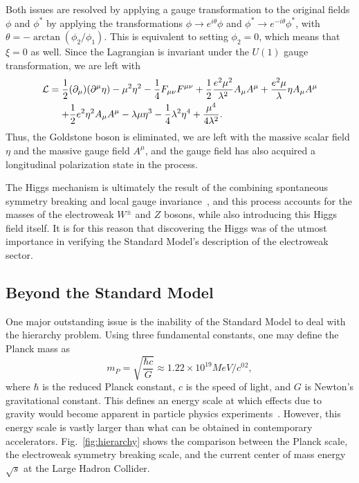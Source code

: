 Both issues are resolved by applying a gauge transformation to the original fields $\phi$ and $\phi^*$ by applying the transformations $\phi\to e^{i\theta}\phi$ and $\phi^*\to e^{-i\theta}\phi^*$, with $\theta=-\arctan(\phi_2/\phi_1)$.
This is equivalent to setting $\phi_2=0$, which means that $\xi=0$ as well.
Since the Lagrangian is invariant under the $U(1)$ gauge transformation, we are left with
\begin{equation}
  \begin{aligned}
    \mathcal{L} &= \frac{1}{2}(\partial_\mu)(\partial^\mu\eta)-\mu^2\eta^2-\frac{1}{4}F_{\mu\nu}F^{\mu\nu}+\frac{1}{2}\frac{e^2\mu^2}{\lambda^2}A_\mu A^\mu+\frac{e^2\mu}{\lambda}\eta A_\mu A^\mu\\
    &\equad+ \frac{1}{2}e^2\eta^2A_\mu A^\mu-\lambda\mu\eta^3-\frac{1}{4}\lambda^2\eta^4+\frac{\mu^4}{4\lambda^2}.
  \end{aligned}
\end{equation}
Thus, the Goldstone boson is eliminated, we are left with the massive scalar field $\eta$ and the massive gauge field $A^\mu$, and the gauge field has also acquired a longitudinal polarization state in the process.

The Higgs mechanism is ultimately the result of the combining spontaneous symmetry breaking and local gauge invariance~\cite{Higgs:1964ia}, and this process accounts for the masses of the electroweak $W^\pm$ and $Z$ bosons, while also introducing this Higgs field itself.
It is for this reason that discovering the Higgs was of the utmost importance in verifying the Standard Model's description of the electroweak sector.

\subsection{Beyond the Standard Model}
One major outstanding issue is the inability of the Standard Model to deal with the hierarchy problem.
Using three fundamental constants, one may define the Planck mass as
\begin{equation}
  m_P=\sqrt{\frac{\hbar c}{G}}\approx1.22\times10^{19}\unit{MeV/\clight^2},
\end{equation}
where $\hbar$ is the reduced Planck constant, $c$ is the speed of light, and $G$ is Newton's gravitational constant.
This defines an energy scale at which effects due to gravity would become apparent in particle physics experiments~\cite{QFTNutshell}.
However, this energy scale is vastly larger than what can be obtained in contemporary accelerators.
Fig.~\ref{fig:hierarchy} shows the comparison between the Planck scale, the electroweak symmetry breaking scale, and the current center of mass energy $\sqrt{s}$ at the Large Hadron Collider.

